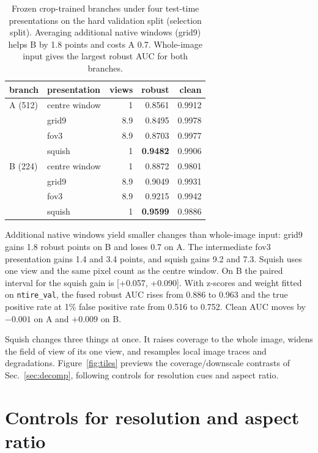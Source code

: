 \documentclass[letterpaper]{article} %
\begin{document}
\begin{table}[t]
\centering
\small
\setlength{\tabcolsep}{4pt}
\begin{tabular}{llrrr}
\toprule
branch & presentation & views & robust & clean \\
\midrule
A (512) & centre window & 1 & 0.8561 & 0.9912 \\
        & grid9 & 8.9 & 0.8495 & 0.9978 \\
        & fov3 & 8.9 & 0.8703 & 0.9977 \\
        & squish & 1 & \textbf{0.9482} & 0.9906 \\
\midrule
B (224) & centre window & 1 & 0.8872 & 0.9801 \\
        & grid9 & 8.9 & 0.9049 & 0.9931 \\
        & fov3 & 8.9 & 0.9215 & 0.9942 \\
        & squish & 1 & \textbf{0.9599} & 0.9886 \\
\bottomrule
\end{tabular}
\caption{Frozen crop-trained branches under four test-time presentations
on the hard validation split (selection split). Averaging additional native windows
(grid9) helps B by 1.8 points and costs A 0.7. Whole-image input gives
the largest robust AUC for both branches.}
\label{tab:probe}
\end{table}

Additional native windows yield smaller changes than whole-image input: grid9 gains 1.8 robust
points on B and loses 0.7 on A. The intermediate fov3 presentation gains 1.4
and 3.4 points, and squish gains 9.2 and 7.3. Squish uses one view and the
same pixel count as the centre window. On B the paired interval for the
squish gain is [+0.057, +0.090]. With z-scores and weight fitted on
\texttt{ntire\_val}, the fused robust AUC rises from 0.886 to 0.963 and the
true positive rate at 1\% false positive rate from 0.516 to 0.752. Clean AUC
moves by $-0.001$ on A and $+0.009$ on B.

Squish changes three things at once. It raises coverage to the whole
image, widens the field of view of its one view, and resamples local image
traces and degradations. Figure~\ref{fig:tiles} previews the coverage/downscale contrasts of
Sec.~\ref{sec:decomp}, following controls for resolution cues and aspect ratio.



\section{Controls for resolution and aspect ratio}
\label{sec:controls}
\end{document}
